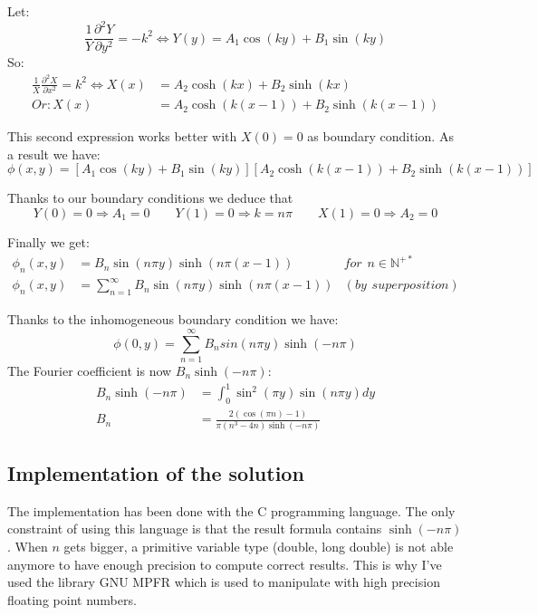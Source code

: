 \documentclass[a4paper,11pt]{article}
\begin{document}
\noindent Let: $$\frac{1}{Y}\frac{\partial^2 Y}{\partial y^2} = - k^2 \Leftrightarrow Y(y) = A_1\cos(k y) + B_1\sin(k y)$$ 
So:
\begin{align*}
  \frac{1}{X}\frac{\partial^2 X}{\partial x^2} = k^2 \Leftrightarrow X(x) & = A_2\cosh(k x) + B_2\sinh(k x) \\
  Or: X(x) & = A_2\cosh(k (x-1)) + B_2\sinh(k (x-1))
\end{align*}

\noindent This second expression works better with $X(0) = 0$ as boundary condition. As a result we have:
$$\phi(x,y) = [ A_1\cos(k y) + B_1\sin(k y)][A_2\cosh(k (x-1)) + B_2\sinh(k (x-1))]$$

\noindent Thanks to our boundary conditions we deduce that
$$Y(0) = 0 \Rightarrow A_1=0 \hspace{2em} Y(1) = 0 \Rightarrow k=n \pi \hspace{2em} X(1) = 0 \Rightarrow A_2 = 0$$

\noindent Finally we get:
\begin{align*}
  \phi_n(x,y) & = B_n \sin(n \pi y)\sinh(n \pi (x-1)) & for\hspace{5pt}n \in \mathbb{N}^{+*} \\
  \phi_n(x,y) & = \sum_{n = 1}^{\infty}{B_n \sin(n \pi y)\sinh(n \pi (x-1))} & (by\hspace{5pt}superposition)
\end{align*}

\noindent Thanks to the inhomogeneous boundary condition we have:
\[
  \phi(0, y) = \sum_{n = 1}^{\infty}{B_n sin(n \pi y)\sinh(-n \pi)}
\]
The Fourier coefficient is now $B_n \sinh(-n \pi)$:
\begin{align*}
  B_n \sinh(-n \pi) & = \int_{0}^{1}{\sin^2(\pi y)\sin(n \pi y)dy} \\
  B_n & = \frac{2(\cos(\pi n) - 1)}{\pi(n^3 - 4n)\sinh(-n \pi)}
\end{align*}

\subsection{Implementation of the solution}
  The implementation has been done with the C programming language. The only constraint of using this language is
  that the result formula contains $\sinh(-n \pi)$. When $n$ gets bigger, a primitive variable type (double, long double)
  is not able anymore to have enough precision to compute correct results. This is why I've used the library
  GNU MPFR which is used to manipulate with high precision floating point numbers.
  
\end{document}
